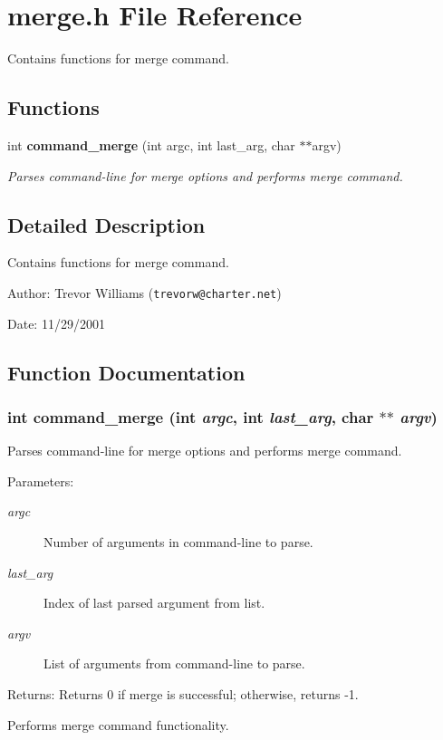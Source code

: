 \section{merge.h File Reference}
\label{merge_8h}
Contains functions for merge command. 


\subsection*{Functions}
\begin{CompactItemize}
\item 
int {\bf command\_\-merge} (int argc, int last\_\-arg, char $\ast$$\ast$argv)
\begin{CompactList}\small\item\em Parses command-line for merge options and performs merge command.\item\end{CompactList}\end{CompactItemize}


\subsection{Detailed Description}
Contains functions for merge command.

\begin{Desc}
\item[Author:]Trevor Williams ({\tt trevorw@charter.net}) \end{Desc}
\begin{Desc}
\item[Date:]11/29/2001 \end{Desc}


\subsection{Function Documentation}
\subsubsection{\setlength{\rightskip}{0pt plus 5cm}int command\_\-merge (int {\em argc}, int {\em last\_\-arg}, char $\ast$$\ast$ {\em argv})}\label{merge_8h_a0}


Parses command-line for merge options and performs merge command.

\begin{Desc}
\item[Parameters:]
\begin{description}
\item[{\em argc}]Number of arguments in command-line to parse. \item[{\em last\_\-arg}]Index of last parsed argument from list. \item[{\em argv}]List of arguments from command-line to parse.\end{description}
\end{Desc}
\begin{Desc}
\item[Returns:]Returns 0 if merge is successful; otherwise, returns -1.\end{Desc}
Performs merge command functionality. 